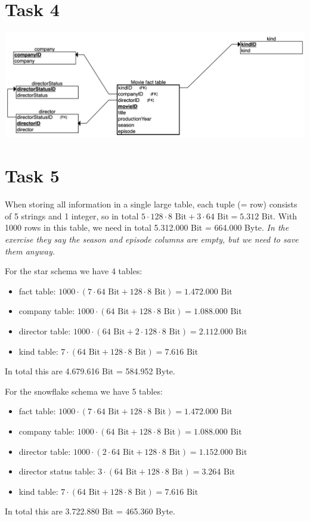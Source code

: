 \documentclass{article}
\begin{document}
	\section*{Task 4}
	\begin{center}
		\includegraphics[scale=0.15]{task1.4}
	\end{center}
	
	\section*{Task 5}
	When storing all information in a single large table, each tuple (= row) consists of 5 strings and 1 integer, so in total $5\cdot 128\cdot 8\text{ Bit} + 3\cdot 64\text{ Bit} = 5.312\text{ Bit}$. With 1000 rows in this table, we need in total 5.312.000 Bit = 664.000 Byte. \textit{In the exercise they say the season and episode columns are empty, but we need to save them anyway.}
	
	For the star schema we have 4 tables:
	\begin{itemize}
		\item fact table: $1000\cdot (7\cdot 64\text{ Bit} + 128\cdot 8\text{ Bit}) = 1.472.000\text{ Bit}$
		\item company table: $1000\cdot (64\text{ Bit} + 128\cdot 8\text{ Bit}) = 1.088.000\text{ Bit}$
		\item director table: $1000\cdot (64\text{ Bit} + 2\cdot 128\cdot 8\text{ Bit}) = 2.112.000\text{ Bit}$
		\item kind table: $7\cdot (64\text{ Bit} + 128\cdot 8\text{ Bit}) = 7.616\text{ Bit}$
	\end{itemize}
	In total this are 4.679.616 Bit = 584.952 Byte.
	
	For the snowflake schema we have 5 tables:
	\begin{itemize}
		\item fact table: $1000\cdot (7\cdot 64\text{ Bit} + 128\cdot 8\text{ Bit}) = 1.472.000\text{ Bit}$
		\item company table: $1000\cdot (64\text{ Bit} + 128\cdot 8\text{ Bit}) = 1.088.000\text{ Bit}$
		\item director table: $1000\cdot (2\cdot 64\text{ Bit} + 128\cdot 8\text{ Bit}) = 1.152.000\text{ Bit}$
		\item director status table: $3\cdot (64\text{ Bit} + 128\cdot 8\text{ Bit}) = 3.264\text{ Bit}$
		\item kind table: $7\cdot (64\text{ Bit} + 128\cdot 8\text{ Bit}) = 7.616\text{ Bit}$
	\end{itemize}
	In total this are 3.722.880 Bit = 465.360 Byte.
\end{document}
